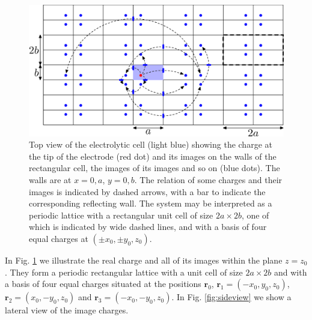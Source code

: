 \documentclass{article}
\begin{document}
\begin{figure}
  \centering
  \includegraphics[width=\textwidth]{paper-1}
  \caption{Top view of the electrolytic cell (light blue) showing the charge at the
    tip of the electrode (red dot) and its images on the walls of the
    rectangular cell, the images of its images and so on (blue dots). The walls are at $x=0,a$,
    $y=0,b$. The relation of some charges and their images is
    indicated by dashed arrows, with a bar to indicate the
    corresponding reflecting wall. The system may be interpreted as a
    periodic lattice with a rectangular unit cell of size $2a\times 2b$,
    one of which is indicated  by wide dashed lines, and with a basis of four equal
    charges at $(\pm x_0, \pm y_0, z_0)$.}
  \label{fig:topview}
\end{figure}
In Fig. \ref{fig:topview} we illustrate the real charge and all of
its images within the plane $z=z_0$. They form a periodic rectangular
lattice with a unit cell of size $2a\times 2b$ and with a basis of
four equal charges situated at the positions $\bm r_0$, $\bm
r_1=(-x_0, y_0, z_0)$, $\bm r_2=(x_0, -y_0, z_0)$ and $\bm r_3=(-x_0,
-y_0, z_0)$. In Fig. \ref{fig:sideview} we show a lateral view of the
image charges.
\end{document}
